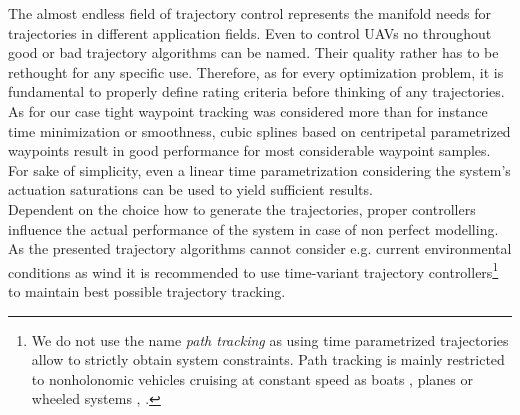 The almost endless field of trajectory control represents the manifold needs for trajectories in different application fields. 
Even to control UAVs no throughout good or bad trajectory algorithms can be named. Their quality rather has to be rethought for any specific use. Therefore, as for every optimization problem, it is fundamental to properly define rating criteria before thinking of any trajectories. \\
As for our case tight waypoint tracking was considered more than for instance time minimization or smoothness, cubic splines based on centripetal parametrized waypoints result in good performance for most considerable waypoint samples.
For sake of simplicity, even a linear time parametrization considering the system's actuation saturations can be used to yield sufficient results. \\
Dependent on the choice how to generate the trajectories, proper controllers influence the actual performance of the system in case of non perfect modelling. As the presented trajectory algorithms cannot consider e.g. current environmental conditions as wind it is recommended to use time-variant trajectory controllers\footnote{We do not use the name \textit{path tracking} as using time parametrized trajectories allow to strictly obtain system constraints. Path tracking is mainly restricted to nonholonomic vehicles cruising at constant speed as boats \cite{williams}, planes or wheeled systems \cite{deluca}, \cite{snider}.} to maintain best possible trajectory tracking.
